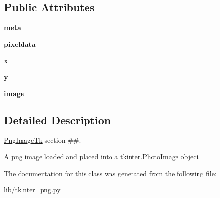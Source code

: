 \subsection*{Public Attributes}
\begin{DoxyCompactItemize}
\item 
\mbox{\label{class_python_01_g_u_i_1_1lib_1_1tkinter__png_1_1_png_image_tk_adbd25ee9e803b2af459a026afb8091b3}} 
{\bfseries meta}
\item 
\mbox{\label{class_python_01_g_u_i_1_1lib_1_1tkinter__png_1_1_png_image_tk_a168c3c0ac25224ac925992ab0093fecf}} 
{\bfseries pixeldata}
\item 
\mbox{\label{class_python_01_g_u_i_1_1lib_1_1tkinter__png_1_1_png_image_tk_a6fcb6ffb9b87c03ebfb3cff72c48cfbf}} 
{\bfseries x}
\item 
\mbox{\label{class_python_01_g_u_i_1_1lib_1_1tkinter__png_1_1_png_image_tk_a348f3ce7f60ff4dea307e336f7651cf4}} 
{\bfseries y}
\item 
\mbox{\label{class_python_01_g_u_i_1_1lib_1_1tkinter__png_1_1_png_image_tk_ab631910d3ffd0cc79b859ef254ed67f3}} 
{\bfseries image}
\end{DoxyCompactItemize}


\subsection{Detailed Description}
\hyperlink{class_python_01_g_u_i_1_1lib_1_1tkinter__png_1_1_png_image_tk}{Png\+Image\+Tk} section \#\#. 

\begin{DoxyVerb}A png image loaded and placed into a tkinter.PhotoImage object\end{DoxyVerb}
 

The documentation for this class was generated from the following file\+:\begin{DoxyCompactItemize}
\item 
lib/tkinter\+\_\+png.\+py\end{DoxyCompactItemize}

